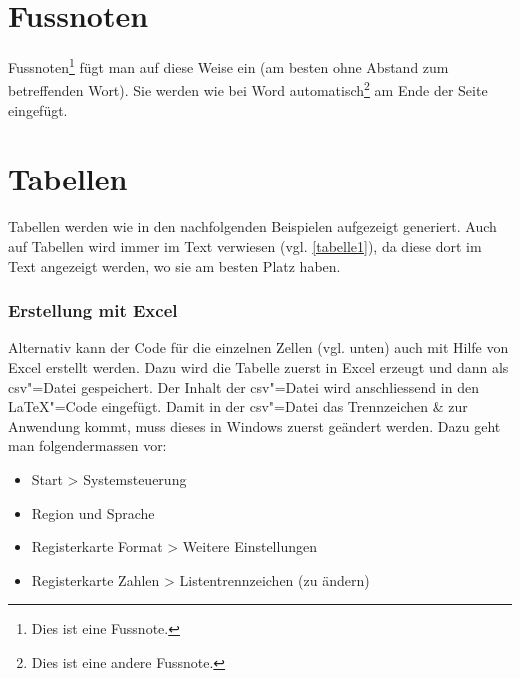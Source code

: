 \section{Fussnoten}%
%
Fussnoten\footnote{Dies ist eine Fussnote.} fügt man auf diese Weise ein (am besten ohne Abstand zum betreffenden Wort). Sie werden wie bei Word automatisch\footnote{Dies ist eine andere Fussnote.} am Ende der Seite eingefügt.%
%
%
%
%
\section{Tabellen}%
%
Tabellen werden wie in den nachfolgenden Beispielen aufgezeigt generiert. Auch auf Tabellen wird immer im Text verwiesen (vgl. \autoref{tabelle1}), da diese dort im Text angezeigt werden, wo sie am besten Platz haben.%
%
\subsubsection{Erstellung mit Excel}%
%
Alternativ kann der Code für die einzelnen Zellen (vgl. unten) auch mit Hilfe von Excel erstellt werden. Dazu wird die Tabelle zuerst in Excel erzeugt und dann als csv"=Datei gespeichert. Der Inhalt der csv"=Datei wird anschliessend in den \LaTeX{}"=Code eingefügt. Damit in der csv"=Datei das Trennzeichen \& zur Anwendung kommt, muss dieses in Windows zuerst geändert werden. Dazu geht man folgendermassen vor:%
%
\begin{itemize}%
\item Start > Systemsteuerung%
\item Region und Sprache%
\item Registerkarte Format > Weitere Einstellungen%
\item Registerkarte Zahlen > Listentrennzeichen (zu \gf{\&} ändern)%
\end{itemize}%
%
%
